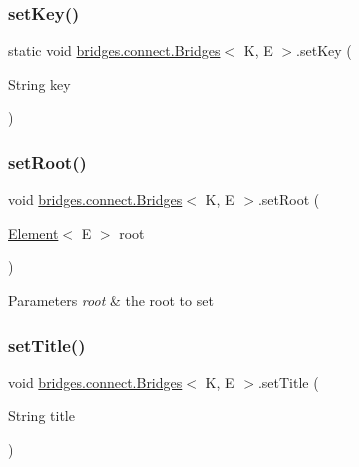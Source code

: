 \subsubsection{\texorpdfstring{set\+Key()}{setKey()}}
{\footnotesize\ttfamily static void \hyperlink{classbridges_1_1connect_1_1_bridges}{bridges.\+connect.\+Bridges}$<$ K, E $>$.set\+Key (\begin{DoxyParamCaption}\item[{String}]{key }\end{DoxyParamCaption})\hspace{0.3cm}{\ttfamily [static]}}

\hypertarget{classbridges_1_1connect_1_1_bridges_aa05295718a1fefa2917dbaf874c79415}{}\label{classbridges_1_1connect_1_1_bridges_aa05295718a1fefa2917dbaf874c79415} 
\subsubsection{\texorpdfstring{set\+Root()}{setRoot()}}
{\footnotesize\ttfamily void \hyperlink{classbridges_1_1connect_1_1_bridges}{bridges.\+connect.\+Bridges}$<$ K, E $>$.set\+Root (\begin{DoxyParamCaption}\item[{\hyperlink{classbridges_1_1base_1_1_element}{Element}$<$ E $>$}]{root }\end{DoxyParamCaption})}


\begin{DoxyParams}{Parameters}
{\em root} & the root to set \\
\hline
\end{DoxyParams}
\hypertarget{classbridges_1_1connect_1_1_bridges_a90c7f6b2b99d88bf241ea7247db47045}{}\label{classbridges_1_1connect_1_1_bridges_a90c7f6b2b99d88bf241ea7247db47045} 
\subsubsection{\texorpdfstring{set\+Title()}{setTitle()}}
{\footnotesize\ttfamily void \hyperlink{classbridges_1_1connect_1_1_bridges}{bridges.\+connect.\+Bridges}$<$ K, E $>$.set\+Title (\begin{DoxyParamCaption}\item[{String}]{title }\end{DoxyParamCaption})}


